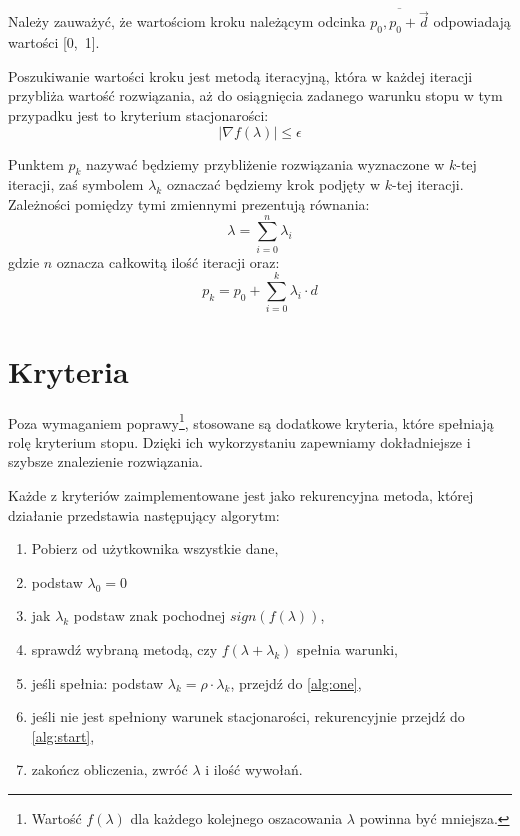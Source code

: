 \documentclass{classrep}
\begin{document}
Należy zauważyć, że wartościom kroku należącym odcinka $\overline{p_0, p_0 + \overrightarrow{d}}$ odpowiadają wartości [0,~1].

Poszukiwanie wartości kroku jest metodą iteracyjną, która w każdej iteracji przybliża wartość rozwiązania, aż do osiągnięcia zadanego warunku stopu \ppauza w tym przypadku jest to kryterium stacjonarości:
\begin{equation}
 \lvert\nabla f(\lambda)\rvert \leq \epsilon
\end{equation}

Punktem $p_k$ nazywać będziemy przybliżenie rozwiązania wyznaczone w $k$-tej iteracji, zaś symbolem $\lambda_k$ oznaczać będziemy krok podjęty w $k$-tej iteracji. Zależności pomiędzy tymi zmiennymi prezentują równania:
\begin{equation}
 \lambda = \displaystyle\sum\limits_{i=0}^n \lambda_i
\end{equation}
gdzie $n$ oznacza całkowitą ilość iteracji oraz:
\begin{equation}
 p_k = p_0 + \displaystyle\sum\limits_{i=0}^k \lambda_i \cdot d
\end{equation}


\section{Kryteria}
Poza wymaganiem poprawy\footnote{Wartość $f(\lambda)$ dla każdego kolejnego oszacowania $\lambda$ powinna być mniejsza.}, stosowane są dodatkowe kryteria, które spełniają rolę kryterium stopu. Dzięki ich wykorzystaniu zapewniamy dokładniejsze i szybsze znalezienie rozwiązania.

Każde z kryteriów zaimplementowane jest jako rekurencyjna metoda, której działanie przedstawia następujący algorytm:
\begin{enumerate}
 \item Pobierz od użytkownika wszystkie dane,
 \item podstaw $\lambda_0 = 0$
 \item jak $\lambda_k$ podstaw znak pochodnej $sign(f(\lambda))$,\label{alg:start}
 \item sprawdź wybraną metodą, czy $f(\lambda + \lambda_k)$ spełnia warunki,\label{alg:one}
 \item jeśli spełnia: podstaw $\lambda_k = \rho \cdot \lambda_k$, przejdź do \ref{alg:one},
 \item jeśli nie jest spełniony warunek stacjonarości, rekurencyjnie przejdź do \ref{alg:start},
 \item zakończ obliczenia, zwróć $\lambda$ i ilość wywołań.
\end{enumerate}
\end{document}
